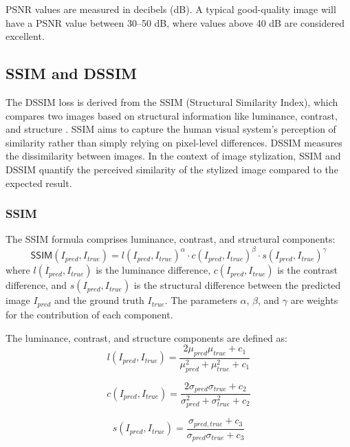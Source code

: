 PSNR values are measured in decibels (dB). A typical good-quality image will have a PSNR value between 30–50 dB, where values above 40 dB are considered excellent.

\subsection{SSIM and DSSIM}

The DSSIM loss is derived from the SSIM (Structural Similarity Index), which compares two images based on structural information like luminance, contrast, and structure \citep{Wang.2004, Nilsson.2020}. SSIM aims to capture the human visual system's perception of similarity rather than simply relying on pixel-level differences. DSSIM measures the dissimilarity between images. In the context of image stylization, SSIM and DSSIM quantify the perceived similarity of the stylized image compared to the expected result.

\subsubsection{SSIM}
The SSIM formula comprises luminance, contrast, and structural components:
\begin{equation}
    \mathsf{SSIM}(I_{pred}, I_{true}) = l(I_{pred}, I_{true})^\alpha \cdot c(I_{pred}, I_{true})^\beta \cdot s(I_{pred}, I_{true})^\gamma
\end{equation}
where $l(I_{pred}, I_{true})$ is the luminance difference, $c(I_{pred}, I_{true})$ is the contrast difference, and $s(I_{pred}, I_{true})$ is the structural difference between the predicted image $I_{pred}$ and the ground truth $I_{true}$. The parameters $\alpha$, $\beta$, and $\gamma$ are weights for the contribution of each component.

The luminance, contrast, and structure components are defined as:
\begin{equation}
    l(I_{pred}, I_{true}) = \frac{2\mu_{pred}\mu_{true} + c_1}{\mu_{pred}^2 + \mu_{true}^2 + c_1}
\end{equation}

\begin{equation}
    c(I_{pred}, I_{true}) = \frac{2\sigma_{pred}\sigma_{true} + c_2}{\sigma_{pred}^2 + \sigma_{true}^2 + c_2}
\end{equation}

\begin{equation}
    s(I_{pred}, I_{true}) = \frac{\sigma_{pred, true} + c_3}{\sigma_{pred} \sigma_{true} + c_3}
\end{equation}

